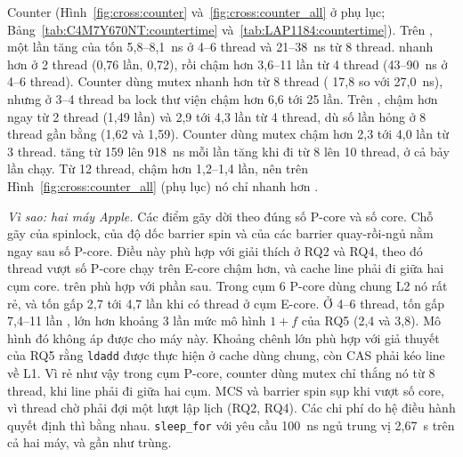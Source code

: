 Counter (Hình~\ref{fig:cross:counter} và~\ref{fig:cross:counter_all} ở phụ lục; Bảng~\ref{tab:C4M7Y670NT:countertime}
và~\ref{tab:LAP1184:countertime}). Trên , một lần tăng của  tốn 5,8--8,1~ns
ở 4--6 thread và 21--38~ns từ 8 thread.  nhanh hơn  ở 2 thread (0,76 lần,
 0,72), rồi chậm hơn 3,6--11 lần từ 4 thread (43--90~ns ở 4--6 thread). Counter dùng
mutex nhanh hơn  từ 8 thread ( 17,8 so với 27,0~ns), nhưng ở 3--4 thread
ba lock thư viện chậm hơn  6,6 tới 25 lần. Trên ,  chậm hơn
 ngay từ 2 thread (1,49 lần) và 2,9 tới 4,3 lần từ 4 thread, dù số lần hỏng ở 8 thread gần bằng
 (1,62 và 1,59). Counter dùng mutex chậm hơn  2,3 tới 4,0 lần từ 3 thread.
 tăng từ 159 lên 918~ns mỗi lần tăng khi đi từ 8 lên 10 thread, ở cả bảy lần chạy. Từ 12
thread,  chậm hơn  1,2--1,4 lần, nên trên Hình~\ref{fig:cross:counter_all}
(phụ lục) nó chỉ nhanh hơn .

\emph{Vì sao: hai máy Apple.} Các điểm gãy dời theo đúng số P-core và số core. Chỗ gãy của spinlock, của
độ dốc barrier spin và của các barrier quay-rồi-ngủ nằm ngay sau số P-core. Điều này phù hợp với giải thích
ở RQ2 và RQ4, theo đó thread vượt số P-core chạy trên E-core chậm hơn, và cache line phải đi giữa hai
cụm core.
 trên  phù hợp với phần sau. Trong cụm 6 P-core dùng chung L2 nó rất rẻ, và
tốn gấp 2,7 tới 4,7 lần khi có thread ở cụm E-core. Ở 4--6 thread,  tốn gấp 7,4--11 lần
, lớn hơn khoảng 3 lần mức mô hình $1+f$ của RQ5 (2,4 và 3,8). Mô hình đó không áp được cho
máy này. Khoảng chênh lớn phù hợp với giả thuyết của RQ5 rằng \texttt{ldadd} được thực hiện ở cache dùng
chung, còn CAS phải kéo line về L1. Vì  rẻ như vậy trong cụm P-core, counter dùng mutex chỉ thắng nó từ 8 thread, khi line phải đi giữa hai cụm. MCS và barrier spin sụp khi vượt số
core, vì thread chờ phải đợi một lượt lập lịch (RQ2, RQ4). Các chi phí do hệ điều hành quyết định thì bằng
nhau. \texttt{sleep\_for} với yêu cầu 100~ns ngủ trung vị 2,67~\textmu s trên cả hai máy, và
 gần như trùng.

